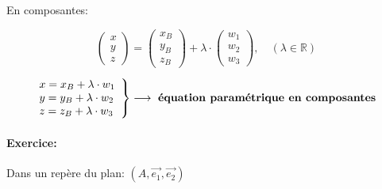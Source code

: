 \documentclass[
    11pt,
    a4paper,
    oneside,
    headinlcude, footinclude,
    twoside,
]{report}
\newcommand{\myVector}[3]{\begin{pmatrix}#1\\#2\\#3\end{pmatrix}}
\renewcommand{\vec}[1]{\overrightarrow{#1}}
\begin{document}
En composantes:

$$\myVector{x}{y}{z} = \myVector{x_{B}}{y_{B}}{z_{B}} + \lambda \cdot \myVector{w_{1}}{w_{2}}{w_{3}},
\quad (\lambda \in \mathbb{R})$$

$$\left.
\begin{array}{l}
    x = x_{B} + \lambda \cdot w_{1} \\
    y = y_{B} + \lambda \cdot w_{2} \\
    z = z_{B} + \lambda \cdot w_{3} \\
\end{array}
\right\} \longrightarrow \text{ \textbf{équation paramétrique en composantes}  }$$

\paragraph{Exercice:}

Dans un repère du plan: $(A, \vec{e_{1}}, \vec{e_{2}})$
\end{document}
